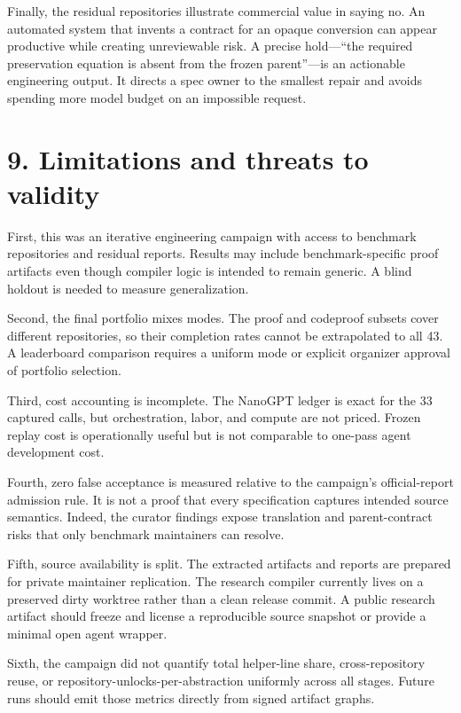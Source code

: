 \documentclass[
  10pt,
]{article}
\begin{document}
Finally, the residual repositories illustrate commercial value in saying
no. An automated system that invents a contract for an opaque conversion
can appear productive while creating unreviewable risk. A precise
hold---``the required preservation equation is absent from the frozen
parent''---is an actionable engineering output. It directs a spec owner
to the smallest repair and avoids spending more model budget on an
impossible request.

\section{9. Limitations and threats to
validity}\label{limitations-and-threats-to-validity}

First, this was an iterative engineering campaign with access to
benchmark repositories and residual reports. Results may include
benchmark-specific proof artifacts even though compiler logic is
intended to remain generic. A blind holdout is needed to measure
generalization.

Second, the final portfolio mixes modes. The proof and codeproof subsets
cover different repositories, so their completion rates cannot be
extrapolated to all 43. A leaderboard comparison requires a uniform mode
or explicit organizer approval of portfolio selection.

Third, cost accounting is incomplete. The NanoGPT ledger is exact for
the 33 captured calls, but orchestration, labor, and compute are not
priced. Frozen replay cost is operationally useful but is not comparable
to one-pass agent development cost.

Fourth, zero false acceptance is measured relative to the campaign's
official-report admission rule. It is not a proof that every
specification captures intended source semantics. Indeed, the curator
findings expose translation and parent-contract risks that only
benchmark maintainers can resolve.

Fifth, source availability is split. The extracted artifacts and reports
are prepared for private maintainer replication. The research compiler
currently lives on a preserved dirty worktree rather than a clean
release commit. A public research artifact should freeze and license a
reproducible source snapshot or provide a minimal open agent wrapper.

Sixth, the campaign did not quantify total helper-line share,
cross-repository reuse, or repository-unlocks-per-abstraction uniformly
across all stages. Future runs should emit those metrics directly from
signed artifact graphs.
\end{document}
